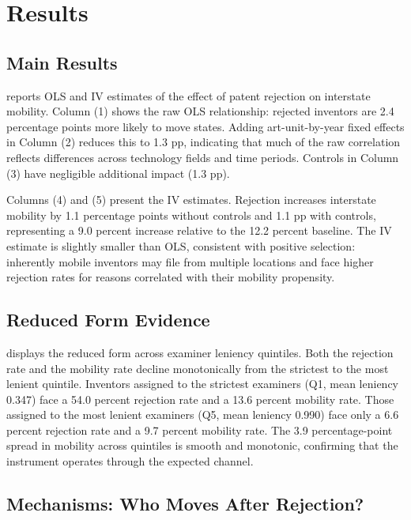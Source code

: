 \documentclass[12pt]{article}
\begin{document}
\section{Results}
\label{sec:results}

\subsection{Main Results}

 reports OLS and IV estimates of the effect of patent rejection on interstate mobility. Column (1) shows the raw OLS relationship: rejected inventors are 2.4 percentage points more likely to move states. Adding art-unit-by-year fixed effects in Column (2) reduces this to 1.3 pp, indicating that much of the raw correlation reflects differences across technology fields and time periods. Controls in Column (3) have negligible additional impact (1.3 pp).

Columns (4) and (5) present the IV estimates. Rejection increases interstate mobility by 1.1 percentage points without controls and 1.1 pp with controls, representing a 9.0 percent increase relative to the 12.2 percent baseline. The IV estimate is slightly smaller than OLS, consistent with positive selection: inherently mobile inventors may file from multiple locations and face higher rejection rates for reasons correlated with their mobility propensity.



\subsection{Reduced Form Evidence}

 displays the reduced form across examiner leniency quintiles. Both the rejection rate and the mobility rate decline monotonically from the strictest to the most lenient quintile. Inventors assigned to the strictest examiners (Q1, mean leniency 0.347) face a 54.0 percent rejection rate and a 13.6 percent mobility rate. Those assigned to the most lenient examiners (Q5, mean leniency 0.990) face only a 6.6 percent rejection rate and a 9.7 percent mobility rate. The 3.9 percentage-point spread in mobility across quintiles is smooth and monotonic, confirming that the instrument operates through the expected channel.



\subsection{Mechanisms: Who Moves After Rejection?}
\end{document}
